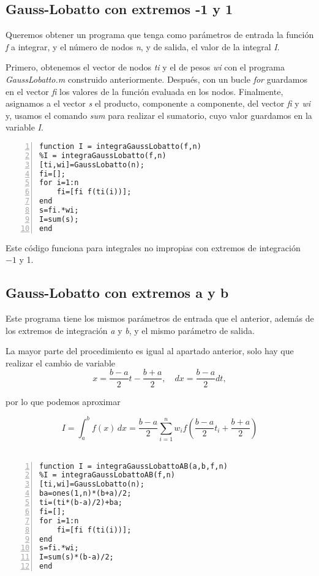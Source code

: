 \documentclass[a4paper]{article}
\begin{document}
\subsection{Gauss-Lobatto con extremos -1 y 1}
Queremos obtener un programa que tenga como parámetros de entrada la función \textit{f} a integrar, y el número de nodos \textit{n}, y de salida, el valor de la integral \textit{I}.

Primero, obtenemos el vector de nodos \textit{ti} y el de pesos \textit{wi} con el programa \textit{GaussLobatto.m} construido anteriormente. Después, con un bucle \textit{for} guardamos en el vector \textit{fi} los valores de la función evaluada en los nodos. Finalmente, asignamos a el vector \textit{s} el producto, componente a componente, del vector \textit{fi} y \textit{wi} y, usamos el comando \textit{sum} para realizar el sumatorio, cuyo valor guardamos en la variable \textit{I}.
\begin{lstlisting}[frame=single, numbers=left, style=Matlab-Pyglike]
function I = integraGaussLobatto(f,n)
%I = integraGaussLobatto(f,n)
[ti,wi]=GaussLobatto(n);
fi=[];
for i=1:n
    fi=[fi f(ti(i))];
end
s=fi.*wi;
I=sum(s);
end
\end{lstlisting}

Este código funciona para integrales no impropias con extremos de integración $-1$ y 1.

\subsection{Gauss-Lobatto con extremos a y b}
Este programa tiene los mismos parámetros de entrada que el anterior, además de los extremos de integración \textit{a} y \textit{b}, y el mismo parámetro de salida.

La mayor parte del procedimiento es igual al apartado anterior, solo hay que realizar el cambio de variable
\[x=\frac{b-a}{2}t-\frac{b+a}{2},\quad dx=\frac{b-a}{2}dt,\]

por lo que podemos aproximar

\[\displaystyle I=\int_{a}^{b} \! f(x)  \,dx = \frac{b-a}{2} \sum_{i=1}^{n}w_i f \left(\frac{b-a}{2}t_i + \frac{b+a}{2} \right)\]
\\
\begin{lstlisting}[frame=single, numbers=left, style=Matlab-Pyglike]
function I = integraGaussLobattoAB(a,b,f,n)
%I = integraGaussLobattoAB(f,n)
[ti,wi]=GaussLobatto(n);
ba=ones(1,n)*(b+a)/2;
ti=(ti*(b-a)/2)+ba;
fi=[];
for i=1:n
    fi=[fi f(ti(i))];
end
s=fi.*wi;
I=sum(s)*(b-a)/2;
end
\end{lstlisting}
\end{document}
